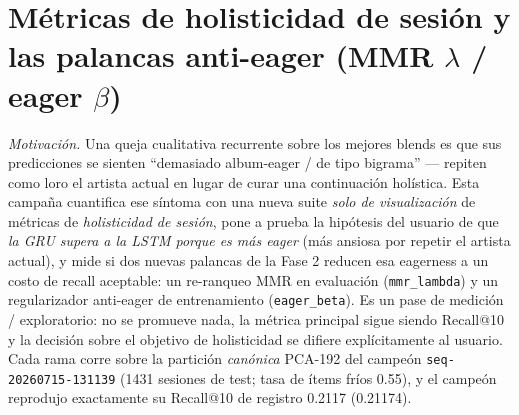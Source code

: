 \documentclass[11pt]{article}
\newcommand{\dsid}[1]{\texttt{\small #1}}
\begin{document}
\section{Métricas de holisticidad de sesión y las palancas anti-eager (MMR $\lambda$ / eager $\beta$)}
\label{sec:holisticness}
\emph{Motivación.} Una queja cualitativa recurrente sobre los mejores blends es que
sus predicciones se sienten ``demasiado album-eager / de tipo bigrama'' --- repiten
como loro el artista actual en lugar de curar una continuación holística. Esta
campaña cuantifica ese síntoma con una nueva suite \emph{solo de visualización} de
métricas de \emph{holisticidad de sesión}, pone a prueba la hipótesis del usuario de
que \emph{la GRU supera a la LSTM porque es más eager} (más ansiosa por repetir el
artista actual), y mide si dos nuevas palancas de la Fase 2 reducen esa eagerness a
un costo de recall aceptable: un re-ranqueo MMR en evaluación (\texttt{mmr\_lambda}) y
un regularizador anti-eager de entrenamiento (\texttt{eager\_beta}). Es un pase de
medición / exploratorio: no se promueve nada, la métrica principal sigue siendo
Recall@10 y la decisión sobre el objetivo de holisticidad se difiere explícitamente al
usuario. Cada rama corre sobre la partición \emph{canónica} PCA-192 del campeón
\dsid{seq-20260715-131139} (\num{1431} sesiones de test; tasa de ítems fríos
\num{0.55}), y el campeón reprodujo exactamente su Recall@10 de registro \num{0.2117}
(\num{0.21174}).
\end{document}
